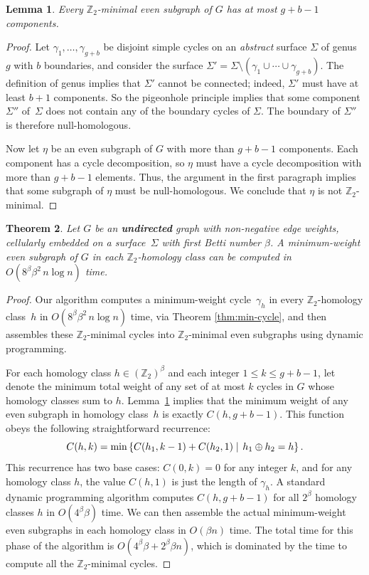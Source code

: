 \documentclass[11pt,twoside]{article}
\def\Z{\mathbb{Z}}
\newtheorem{theorem}{Theorem}[section]
\newtheorem{lemma}[theorem]{Lemma}
\begin{document}
{\begin{lemma}
\label{lem:even-comps}
Every $\Z_2$-minimal even subgraph of $G$ has at most $g+b-1$ components.
\end{lemma}

\begin{proof}
Let $\gamma_1, \dots, \gamma_{g+b}$ be disjoint simple cycles on an \emph{abstract} surface $\Sigma$ of genus $g$ with $b$ boundaries, and consider the surface $\Sigma' = \Sigma \setminus (\gamma_1 \cup \cdots \cup \gamma_{g+b})$.  The definition of genus implies that $\Sigma'$ cannot be connected; indeed, $\Sigma'$ must have at least $b+1$ components.  So the pigeonhole principle implies that some component $\Sigma''$ of~$\Sigma$ does not contain any of the boundary cycles of $\Sigma$.  The boundary of $\Sigma''$ is therefore null-homologous.

Now let $\eta$ be an even subgraph of $G$ with more than $g+b-1$ components.  Each component has a cycle decomposition, so $\eta$ must have a cycle decomposition with more than $g+b-1$ elements.  Thus, the argument in the first paragraph implies that some subgraph of $\eta$ must be null-homologous.  We conclude that $\eta$ is not $\Z_2$-minimal.
\end{proof}

\begin{theorem}
\label{thm:min-even}
Let $G$ be an \textbf{undirected} graph with non-negative edge weights, cellularly embedded on a surface~$\Sigma$ with first Betti number $\beta$.  A minimum-weight even subgraph of $G$ in each $\Z_2$-homology class can be computed in $O(8^\beta \beta^2\, n\log n)$ time.
\end{theorem}

\begin{proof}
Our algorithm computes a minimum-weight cycle~$\gamma_h$ in every $\Z_2$-homology class~$h$ in $O(8^\beta \beta^2\, n\log n)$ time, via Theorem \ref{thm:min-cycle}, and then assembles these $\Z_2$-minimal cycles into $\Z_2$-minimal even subgraphs using dynamic programming.

For each homology class $h\in (\Z_2)^\beta$ and each integer $1\le k\le g+b-1$, let  denote the minimum total weight of any set of at most $k$ cycles in $G$ whose homology classes sum to $h$.  Lemma~\ref{lem:even-comps} implies that the minimum weight of any even subgraph in homology class~$h$ is exactly $C(h, g+b-1)$.  This function obeys the following straightforward recurrence:
\[
	C(h,k) = \min\Setbar{C(h_1,k-1) + C(h_2, 1)}{h_1\oplus h_2 = h}.
\]
This recurrence has two base cases: $C(0, k) = 0$ for any integer $k$, and for any homology class $h$, the value $C(h,1)$ is just the length of $\gamma_h$.  A standard dynamic programming algorithm computes $C(h, g+b-1)$ for all $2^\beta$ homology classes $h$ in $O(4^\beta \beta)$ time.  We can then assemble the actual minimum-weight even subgraphs in each homology class in $O(\beta n)$ time.  The total time for this phase of the algorithm is $O(4^\beta \beta + 2^\beta \beta n)$, which is dominated by the time to compute all the $\Z_2$-minimal cycles.
\end{proof}

}
\end{document}
